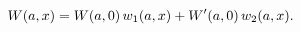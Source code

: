 \[\mathop{W\/}\nolimits\!\left(a,x\right)=\mathop{W\/}\nolimits\!\left(a,0\right%
)w_{1}(a,x)+\mathop{W\/}\nolimits'\!\left(a,0\right)w_{2}(a,x).\]
